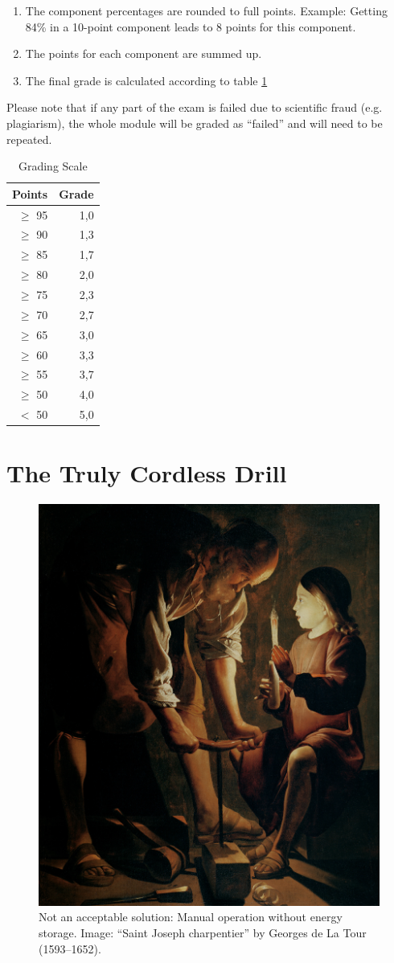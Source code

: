 \documentclass[headinclude=true]{scrartcl}
\begin{document}
\begin{enumerate}
 \item The component percentages are rounded to full points. Example: Getting 84\% in a 10-point component leads to 8 points for this component.
 \item The points for each component are summed up.
 \item The final grade is calculated according to table \ref{tab:notenskala}
\end{enumerate}

Please note that if any part of the exam is failed due to scientific fraud (e.g. plagiarism), the whole module will be graded as ``failed'' and will need to be repeated.

\begin{table} \centering
 \caption{Grading Scale}
 \label{tab:notenskala}
 \begin{tabular}{rr}
  \toprule
  Points & Grade \\ \midrule
  $\geq$ 95 & 1,0 \\
  $\geq$ 90 & 1,3 \\
  $\geq$ 85 & 1,7 \\
  $\geq$ 80 & 2,0 \\
  $\geq$ 75 & 2,3 \\
  $\geq$ 70 & 2,7 \\
  $\geq$ 65 & 3,0 \\
  $\geq$ 60 & 3,3 \\
  $\geq$ 55 & 3,7 \\
  $\geq$ 50 & 4,0 \\
  $<$ 50 & 5,0 \\ \bottomrule
 \end{tabular}
\end{table}

\section{The Truly Cordless Drill}
\label{chap:projektaufgabe}

\begin{figure}[h!] \centering
 \includegraphics[width=0.5\linewidth]{La_Tour}
 \caption{Not an acceptable solution: Manual operation without energy storage. Image: ``Saint Joseph charpentier'' by Georges de La Tour (1593–1652).}
\end{figure}
\end{document}

